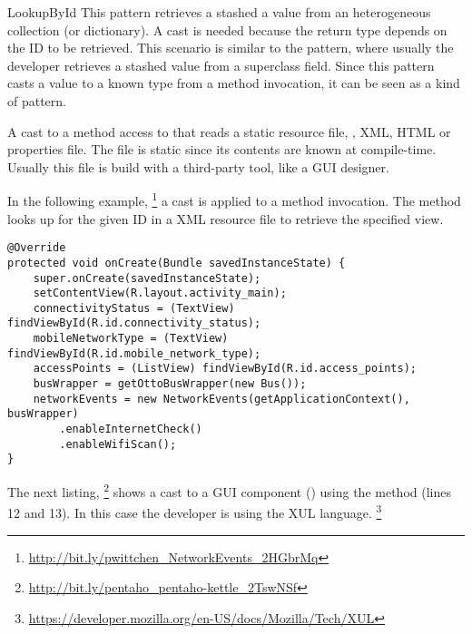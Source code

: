 \begin{pattern}{LookupById}
This pattern retrieves a stashed a value from an heterogeneous collection (or dictionary).
A cast is needed because the return type depends on the ID to be retrieved.
This scenario is similar to the  pattern,
where usually the developer retrieves a stashed value from a superclass field.
Since this pattern casts a value to a known type from a method invocation,
it can be seen as a kind of  pattern.






A cast to a method access to that reads a static resource file, \eg,
XML, HTML or \java{} properties file.
The file is static since its contents are known at compile-time.
Usually this file is build with a third-party tool, like a GUI designer.

In the following example,%
\footnote{\url{http://bit.ly/pwittchen_NetworkEvents_2HGbrMq}}
a cast is applied to a  method invocation.
The  method looks up for the given ID in a XML resource file to retrieve the specified view. 

\begin{verbatim}
@Override
protected void onCreate(Bundle savedInstanceState) {
    super.onCreate(savedInstanceState);
    setContentView(R.layout.activity_main);
    connectivityStatus = (TextView) findViewById(R.id.connectivity_status);
    mobileNetworkType = (TextView) findViewById(R.id.mobile_network_type);
    accessPoints = (ListView) findViewById(R.id.access_points);
    busWrapper = getOttoBusWrapper(new Bus());
    networkEvents = new NetworkEvents(getApplicationContext(), busWrapper)
        .enableInternetCheck()
        .enableWifiScan();
}
\end{verbatim}

The next listing,%
\footnote{\url{http://bit.ly/pentaho_pentaho-kettle_2TswNSf}}
shows a cast to a GUI component () using the  method (lines 12 and 13).
In this case the developer is using the XUL language.%
\footnote{\url{https://developer.mozilla.org/en-US/docs/Mozilla/Tech/XUL}}


\end{pattern}
